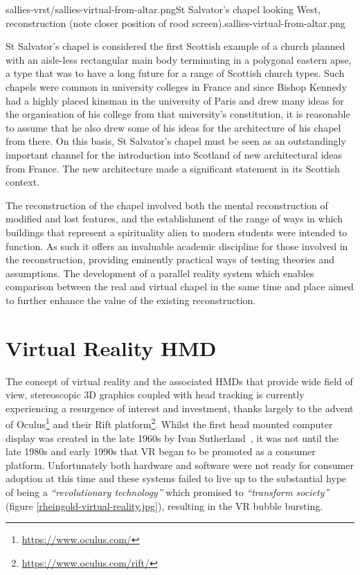        {sallies-vrst/sallies-virtual-from-altar.png}{St Salvator's chapel looking West, reconstruction (note closer position of rood screen).}{sallies-virtual-from-altar.png}

St Salvator's chapel is considered the first Scottish example of a church planned with an aisle-less rectangular main body terminating in a polygonal eastern apse, a type that was to have a long future for a range of Scottish church types. Such chapels were common in university colleges in France and since Bishop Kennedy had a highly placed kinsman in the university of Paris and drew many ideas for the organisation of his college from that university's constitution, it is reasonable to assume that he also drew some of his ideas for the architecture of his chapel from there. On this basis, St Salvator's chapel must be seen as an outstandingly important channel for the introduction into Scotland of new architectural ideas from France. The new architecture made a significant statement in its Scottish context. 

The reconstruction of the chapel involved both the mental reconstruction of modified and lost features, and the establishment of the range of ways in which buildings that represent a spirituality alien to modern students were intended to function. As such it offers an invaluable academic discipline for those involved in the reconstruction, providing eminently practical ways of testing theories and assumptions. The development of a parallel reality system which enables comparison between the real and virtual chapel in the same time and place aimed to further enhance the value of the existing reconstruction.


\section{Virtual Reality HMD}
The concept of virtual reality and the associated HMDs that provide wide field of view, stereoscopic 3D graphics coupled with head tracking is currently experiencing a resurgence of interest and investment, thanks largely to the advent of Oculus\footnote{\url{https://www.oculus.com/}} and their Rift platform\footnote{\url{https://www.oculus.com/rift/}}. Whilst the first head mounted computer display was created in the late 1960s by Ivan Sutherland~\cite{Rheingold1992}, it was not until the late 1980s and early 1990s that VR began to be promoted as a consumer platform. Unfortunately both hardware and software were not ready for consumer adoption at this time and these systems failed to live up to the substantial hype of being a \textit{``revolutionary technology''} which promised to \textit{``transform society''} (figure \ref{rheingold-virtual-reality.jpg}), resulting in the VR bubble bursting.

